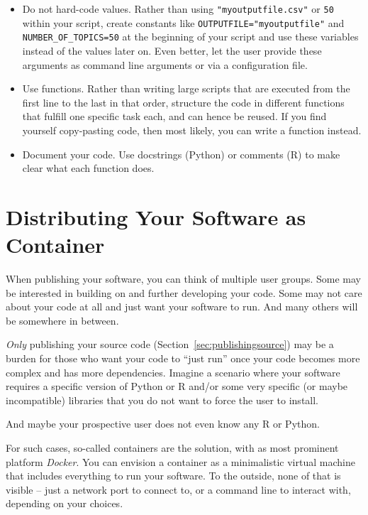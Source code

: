 \begin{itemize}
\item Do not hard-code values. Rather than using \verb|"myoutputfile.csv"| or \verb|50| within your script, create constants like \verb|OUTPUTFILE="myoutputfile"| and \verb|NUMBER_OF_TOPICS=50| at the beginning of your script and use these variables instead of the values later on. Even better, let the user provide these arguments as command line arguments or via a configuration file.
\item Use functions. Rather than writing large scripts that are executed from the first line to the last in that order, structure the code in different functions that fulfill one specific task each, and can hence be reused. If you find yourself copy-pasting code, then most likely, you can write a function instead.
\item Document your code. Use docstrings (Python) or comments (R) to make clear what each function does.
\end{itemize}


%

\section{Distributing Your Software as Container}
\label{sec:container}
When publishing your software, you can think of multiple user
groups. Some may be interested in building on and further developing
your code. Some may not care about your code at all and just want your
software to run. And many others will be somewhere in between.

\emph{Only} publishing your source code (Section~\ref{sec:publishingsource}) may
be a burden for those who want your code to ``just run'' once your
code becomes more complex and has more dependencies. Imagine a
scenario where your software requires a specific version of
Python or R and/or some very specific (or maybe incompatible) libraries
that you do not want to force the user to install.

And maybe your prospective user does not even know any R or Python.

For such cases, so-called containers are the solution, with as most
prominent platform \emph{Docker}. You can envision a container as a
minimalistic virtual machine that includes everything to run your
software. To the outside, none of that is visible -- just a network
port to connect to, or a command line to interact with, depending on
your choices.

